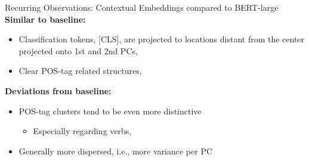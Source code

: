 \begin{frame}{Recurring Observations: Contextual Embeddings compared to BERT-large}
\footnotesize
{}
\vspace{0.2cm}
\textbf{Similar to baseline:}
\begin{itemize}
    \item Classification tokens, [CLS], are projected to locations distant from the center projected onto 1st and 2nd PCs,
    \item Clear POS-tag related structures,
\end{itemize}
\textbf{Deviations from baseline:}
\begin{itemize}
    \item POS-tag clusters tend to be even more distinctive
    \begin{itemize}
        \item Especially regarding verbs,
    \end{itemize}
    \item Generally more dispersed, i.e., more variance per PC
\end{itemize}

\end{frame}



